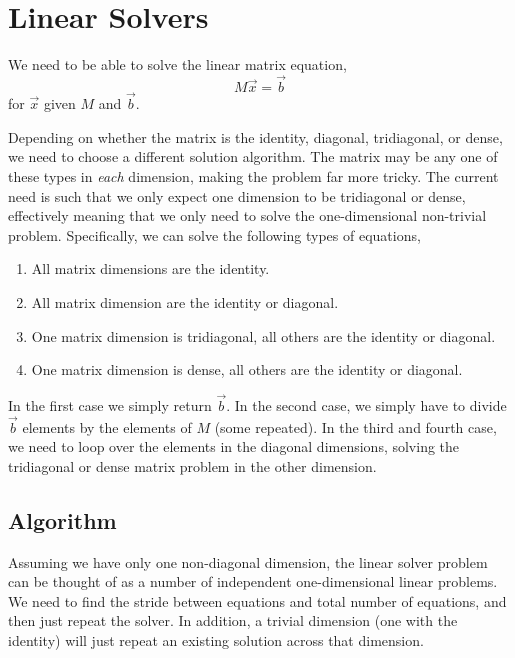 \documentclass[11pt]{article}
\begin{document}
%
%

\section{Linear Solvers}

We need to be able to solve the linear matrix equation,
\begin{equation}
M \vec{x} = \vec{b}
\end{equation}
for $\vec{x}$ given $M$ and $\vec{b}$.

Depending on whether the matrix is the identity, diagonal, tridiagonal, or dense, we need to choose a different solution algorithm. The matrix may be any one of these types in \emph{each} dimension, making the problem far more tricky. The current need is such that we only expect one dimension to be tridiagonal or dense, effectively meaning that we only need to solve the one-dimensional non-trivial problem. Specifically, we can solve the following types of equations,
\begin{enumerate}
\item All matrix dimensions are the identity.
\item All matrix dimension are the identity or diagonal.
\item One matrix dimension is tridiagonal, all others are the identity or diagonal.
\item One matrix dimension is dense, all others are the identity or diagonal.
\end{enumerate}

In the first case we simply return $\vec{b}$. In the second case, we simply have to divide $\vec{b}$ elements by the elements of $M$ (some repeated). In the third and fourth case, we need to loop over the elements in the diagonal dimensions, solving the tridiagonal or dense matrix problem in the other dimension.

\subsection{Algorithm}

Assuming we have only one non-diagonal dimension, the linear solver problem can be thought of as a number of independent one-dimensional linear problems. We need to find the stride between equations and total number of equations, and then just repeat the solver. In addition, a trivial dimension (one with the identity) will just repeat an existing solution across that dimension.
\end{document}
